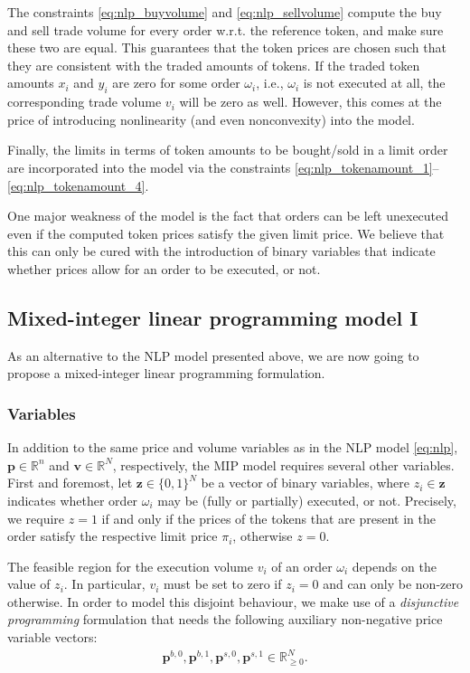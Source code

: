 \documentclass[11pt,parskip=full]{scrartcl}%
\newcommand*{\ie}{i.e., }
\newcommand*{\wrt}{w.r.t. }
\begin{document}
The constraints \eqref{eq:nlp_buyvolume} and \eqref{eq:nlp_sellvolume} compute the buy and sell
trade volume for every order \wrt the reference token, and make sure these two are equal.
This guarantees that the token prices are chosen such that they are consistent with the traded
amounts of tokens.
If the traded token amounts $ x_i $ and $ y_i $ are zero for some order $ \omega_i $, \ie
$ \omega_i $ is not executed at all, the corresponding trade volume $ v_i $ will be zero as well.
However, this comes at the price of introducing nonlinearity (and even nonconvexity) into the
model.

Finally, the limits in terms of token amounts to be bought/sold in a limit order are incorporated
into the model via the constraints \eqref{eq:nlp_tokenamount_1}--\eqref{eq:nlp_tokenamount_4}.

One major weakness of the model is the fact that orders can be left unexecuted even if the computed
token prices satisfy the given limit price.
We believe that this can only be cured with the introduction of binary variables that indicate
whether prices allow for an order to be executed, or not.


\subsection{Mixed-integer linear programming model I}
\label{subsec:MIPmodel_1}

As an alternative to the NLP model presented above, we are now going to propose a
mixed-integer linear programming formulation.

\subsubsection*{Variables}

In addition to the same price and volume variables as in the NLP model \eqref{eq:nlp},
$ \mathbf{p} \in \mathbb{R}^n $ and $ \mathbf{v} \in \mathbb{R}^N $, respectively, the MIP model
requires several other variables.
First and foremost, let $ \mathbf{z} \in \{0,1\}^N $ be a vector of binary variables, where $ z_i
\in \mathbf{z} $ indicates whether order $ \omega_i $ may be (fully or partially) executed, or not.
Precisely, we require $ z = 1 $ if and only if the prices of the tokens that are present in the
order satisfy the respective limit price $ \pi_i $, otherwise $ z = 0 $.

The feasible region for the execution volume $ v_i $ of an order $ \omega_i $ depends on the value
of $ z_i $.
In particular, $ v_i $ must be set to zero if $ z_i = 0 $ and can only be non-zero otherwise.
In order to model this disjoint behaviour, we make use of a \emph{disjunctive programming}
formulation that needs the following auxiliary non-negative price variable vectors:
\begin{align*}
  \mathbf{p}^{b,0}, \mathbf{p}^{b,1}, \mathbf{p}^{s,0}, \mathbf{p}^{s,1} \in \mathbb{R}^N_{\ge 0}.
\end{align*}
\end{document}
